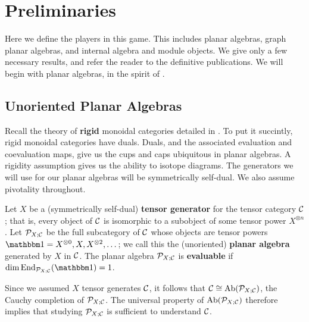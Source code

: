 \section{Preliminaries}\label{sec:prelim}
Here we define the players in this game. 
This includes planar algebras, graph planar algebras, and internal algebra and module objects.
We give only a few necessary results, and refer the reader to the definitive publications.
We will begin with planar algebras, in the spirit of \cite{tricats}.



\subsection{Unoriented Planar Algebras}
Recall the theory of {\bf rigid} monoidal categories detailed in \cite{KW}. 
To put it succintly, rigid monoidal categories have duals. 
Duals, and the associated evaluation and coevaluation maps, give us the cups and caps ubiquitous in planar algebras. 
A rigidity assumption gives us the ability to isotope diagrams. 
The generators we will use for our planar algebras will be symmetrically self-dual.
We also assume pivotality throughout.

Let $X$ be a (symmetrically self-dual) {\bf tensor generator} for the tensor category $\mathcal{C}$; 
that is, every object of $\mathcal{C}$ is isomorphic to a subobject of some tensor power $X^{\otimes n}$. 
Let $\mathcal{P}_{X;\mathcal{C}}$ be the full subcategory of $\mathcal{C}$ whose objects are tensor powers $\unit=X^{\otimes0},X,X^{\otimes2},\dots$; 
we call this the (unoriented) {\bf planar algebra} generated by $X$ in $\mathcal{C}$. 
The planar algebra $\mathcal{P}_{X;\mathcal{C}}$ is {\bf evaluable} if $\dim\End_{\PP_{X;\CC}}(\unit)=1$.

Since we assumed $X$ tensor generates $\mathcal{C}$, it follows that $\mathcal{C} \cong \operatorname{Ab}(\mathcal{P}_{X;\mathcal{C}})$, 
the Cauchy completion of $\mathcal{P}_{X;\mathcal{C}}$. 
The universal property of $\operatorname{Ab}(\mathcal{P}_{X;\mathcal{C}})$ therefore implies 
that studying $\mathcal{P}_{X;\mathcal{C}}$ is sufficient to understand $\mathcal{C}$.  


